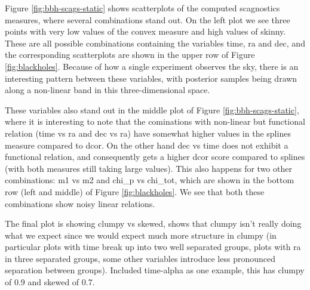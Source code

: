 Figure \ref{fig:bbh-scags-static} shows scatterplots of the computed
scagnostics measures, where several combinations stand out. On the left
plot we see three points with very low values of the convex measure and
high values of skinny. These are all possible combinations containing
the variables time, ra and dec, and the corresponding scatterplots are
shown in the upper row of Figure \ref{fig:blackholes}. Because of how a
single experiment observes the sky, there is an interesting pattern
between these variables, with posterior samples being drawn along a
non-linear band in this three-dimensional space.

These variables also stand out in the middle plot of Figure
\ref{fig:bbh-scags-static}, where it is interesting to note that the
cominations with non-linear but functional relation (time vs ra and dec
vs ra) have somewhat higher values in the splines measure compared to
dcor. On the other hand dec vs time does not exhibit a functional
relation, and consequently gets a higher dcor score compared to splines
(with both measures still taking large values). This also happens for
two other combinations: m1 vs m2 and chi\_p vs chi\_tot, which are shown
in the bottom row (left and middle) of Figure \ref{fig:blackholes}. We
see that both these combinations show noisy linear relations.

The final plot is showing clumpy vs skewed, shows that clumpy isn't
really doing what we expect since we would expect much more structure in
clumpy (in particular plots with time break up into two well separated
groups, plots with ra in three separated groups, some other variables
introduce less pronounced separation between groups). Included
time-alpha as one example, this has clumpy of 0.9 and skewed of 0.7.

